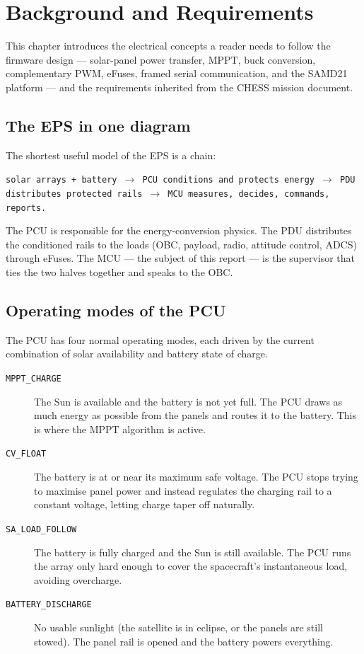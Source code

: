 \section{Background and Requirements}
\label{sec:background}

This chapter introduces the electrical concepts a reader needs to
follow the firmware design --- solar-panel power transfer, MPPT,
buck conversion, complementary PWM, eFuses, framed serial
communication, and the SAMD21 platform --- and the requirements
inherited from the CHESS mission document.

\subsection{The EPS in one diagram}

The shortest useful model of the EPS is a chain:

\begin{center}
\texttt{solar arrays + battery $\rightarrow$ PCU conditions and
protects energy $\rightarrow$ PDU distributes protected rails
$\rightarrow$ MCU measures, decides, commands, reports.}
\end{center}

The PCU is responsible for the energy-conversion physics. The PDU
distributes the conditioned rails to the loads (OBC, payload, radio,
attitude control, ADCS) through eFuses. The MCU --- the subject of
this report --- is the supervisor that ties the two halves
together and speaks to the OBC.

\subsection{Operating modes of the PCU}
\label{sec:pcu-modes}

The PCU has four normal operating modes, each driven by the current
combination of solar availability and battery state of charge.

\begin{description}
\item[\texttt{MPPT\_CHARGE}] The Sun is available and the battery is
not yet full. The PCU draws as much energy as possible from the
panels and routes it to the battery. This is where the MPPT
algorithm is active.

\item[\texttt{CV\_FLOAT}] The battery is at or near its maximum
safe voltage. The PCU stops trying to maximise panel power and
instead regulates the charging rail to a constant voltage, letting
charge taper off naturally.

\item[\texttt{SA\_LOAD\_FOLLOW}] The battery is fully charged and
the Sun is still available. The PCU runs the array only hard enough
to cover the spacecraft's instantaneous load, avoiding overcharge.

\item[\texttt{BATTERY\_DISCHARGE}] No usable sunlight (the satellite
is in eclipse, or the panels are still stowed). The panel rail is
opened and the battery powers everything.
\end{description}

